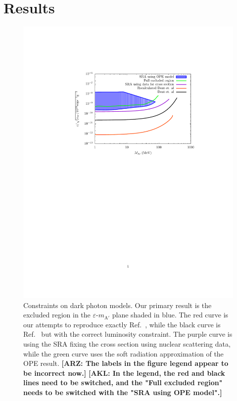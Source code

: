 \documentclass[nofootinbib,prd,superscriptaddress,twocolumn]{revtex4}
\newcommand{\arz}[1]{{{\bf{\color{BrickRed}[ARZ: #1]}}}}
\newcommand{\akl}[1]{{{\bf{\color{Blue}[AKL: #1]}}}}
\begin{document}
\section{Results}
\label{section:results}



\begin{figure}[th]
\includegraphics[width=14cm]{compiledbounds_edited.pdf}
\caption{
Constraints on dark photon models. Our primary result is the excluded region 
in the $\varepsilon$-$m_{\mathrm{A'}}$ plane shaded in blue. The red curve is our attempts to reproduce exactly Ref.~\cite{dent_etal12}, while the black curve is Ref.~\cite{dent_etal12} but with the correct luminosity constraint.  The purple curve is using the SRA fixing the cross section using nuclear scattering data, while the green curve uses the soft radiation approximation of the OPE result.  \arz{The labels in the figure legend appear to be incorrect now.} \akl{In the legend, the red and black lines need to be switched, and the "Full excluded region" needs to be switched with the "SRA using OPE model".}
}
\label{fig:constraint}
\end{figure}
\end{document}
